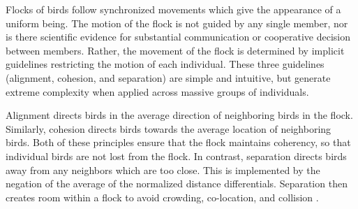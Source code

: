 Flocks of birds follow synchronized movements which give the
appearance of a uniform being. The motion of the flock is not guided
by any single member, nor is there scientific evidence for substantial
communication or cooperative decision between members.  Rather, the
movement of the flock is determined by implicit guidelines restricting
the motion of each individual. These three guidelines (alignment,
cohesion, and separation) are simple and intuitive, but generate
extreme complexity when applied across massive groups of individuals.

Alignment directs birds in the average direction of neighboring birds
in the flock. Similarly, cohesion directs birds towards the average
location of neighboring birds. Both of these principles ensure that
the flock maintains coherency, so that individual birds are not lost
from the flock. In contrast, separation directs birds away from any
neighbors which are too close. This is implemented by the negation of
the average of the normalized distance differentials. Separation then
creates room within a flock to avoid crowding, co-location, and
collision \cite{Reynolds}.
